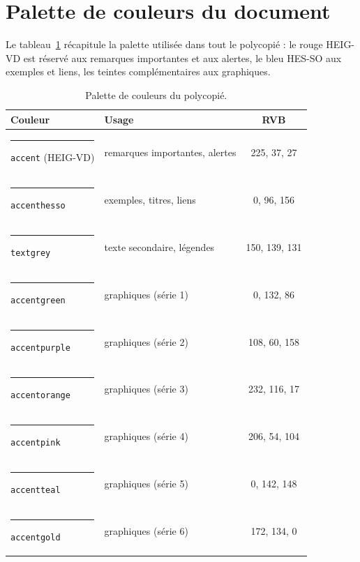 \section{Palette de couleurs du document}

Le tableau~\ref{tab:palette} récapitule la palette utilisée dans tout
le polycopié : le rouge HEIG-VD est réservé aux remarques importantes
et aux alertes, le bleu HES-SO aux exemples et liens, les teintes
complémentaires aux graphiques.

\begin{table}[htbp]
\centering
\caption{Palette de couleurs du polycopié.}
\label{tab:palette}
\small
\begin{tabular}{llc}
\toprule
\textcolor{accenthesso}{\textbf{Couleur}} &
\textcolor{accenthesso}{\textbf{Usage}} &
\textcolor{accenthesso}{\textbf{RVB}} \\
\midrule
\textcolor{accent}{\rule{0.4cm}{0.25cm}} \texttt{accent} (HEIG-VD)
  & remarques importantes, alertes & 225, 37, 27 \\
\textcolor{accenthesso}{\rule{0.4cm}{0.25cm}} \texttt{accenthesso}
  & exemples, titres, liens & 0, 96, 156 \\
\textcolor{textgrey}{\rule{0.4cm}{0.25cm}} \texttt{textgrey}
  & texte secondaire, légendes & 150, 139, 131 \\
\midrule
\textcolor{accentgreen}{\rule{0.4cm}{0.25cm}} \texttt{accentgreen}
  & graphiques (série 1) & 0, 132, 86 \\
\textcolor{accentpurple}{\rule{0.4cm}{0.25cm}} \texttt{accentpurple}
  & graphiques (série 2) & 108, 60, 158 \\
\textcolor{accentorange}{\rule{0.4cm}{0.25cm}} \texttt{accentorange}
  & graphiques (série 3) & 232, 116, 17 \\
\textcolor{accentpink}{\rule{0.4cm}{0.25cm}} \texttt{accentpink}
  & graphiques (série 4) & 206, 54, 104 \\
\textcolor{accentteal}{\rule{0.4cm}{0.25cm}} \texttt{accentteal}
  & graphiques (série 5) & 0, 142, 148 \\
\textcolor{accentgold}{\rule{0.4cm}{0.25cm}} \texttt{accentgold}
  & graphiques (série 6) & 172, 134, 0 \\
\bottomrule
\end{tabular}
\end{table}

